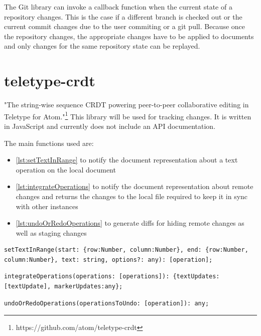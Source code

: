 The Git library can invoke a callback function when the current state of a repository changes. This is the case if a different branch is checked out or the current commit changes due to the user commiting or a git pull. Because once the repository changes, the appropriate changes have to be applied to documents and only changes for the same repository state can be replayed.

\section{teletype-crdt}

"The string-wise sequence CRDT powering peer-to-peer collaborative editing in Teletype for Atom."\footnote{https://github.com/atom/teletype-crdt}
This library will be used for tracking changes. It is written in JavaScript and currently does not include an API documentation.

The main functions used are: 

\begin{itemize}
    \item \autoref{lst:setTextInRange} to notify the document representation about a text operation on the local document
    \item \autoref{lst:integrateOperations} to notify the document representation about remote changes and returns the changes to the local file required to keep it in sync with other instances
    \item \autoref{lst:undoOrRedoOperations} to generate diffs for hiding remote changes as well as staging changes
\end{itemize}


\begin{lstlisting}[label={lst:setTextInRange}, caption=teletype-crdt setTextInRange]
setTextInRange(start: {row:Number, column:Number}, end: {row:Number, column:Number}, text: string, options?: any): [operation];
\end{lstlisting}

\begin{lstlisting}[label={lst:integrateOperations}, caption=teletype-crdt integrateOperations]
integrateOperations(operations: [operations]): {textUpdates:[textUpdate], markerUpdates:any};
\end{lstlisting}

\begin{lstlisting}[label={lst:undoOrRedoOperations}, caption=teletype-crdt undoOrRedoOperations]
undoOrRedoOperations(operationsToUndo: [operation]): any;
\end{lstlisting}

